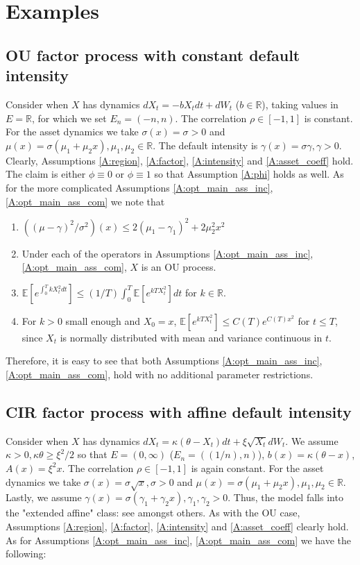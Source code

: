 \documentclass[11pt, letterpaper]{amsart}
\theoremstyle{definition}
\theoremstyle{remark}
\numberwithin{equation}{section}
\newcommand{\reals}{\mathbb R}
\newcommand{\esp}{\mathbb{E}}
\newcommand{\bra}[1]{\left[#1\right]}
\begin{document}
\section{Examples}\label{S:examples}

\subsection{OU factor process with constant default intensity}\label{SS:OU}  Consider when $X$ has dynamics $dX_t = -bX_t dt + dW_t$ ($b\in\reals$), taking values in $E = \reals$,  for which we set $E_n = (-n,n)$. The correlation $\rho \in [-1,1]$ is constant.  For the asset dynamics we take $\sigma(x) = \sigma > 0$ and  $\mu(x) = \sigma\left(\mu_1 + \mu_2x\right), \mu_1,\mu_2\in\reals$. The default intensity is $\gamma(x) = \sigma\gamma, \gamma > 0$. Clearly, Assumptions \ref{A:region}, \ref{A:factor}, \ref{A:intensity} and \ref{A:asset_coeff} hold.  The claim is either $\phi\equiv 0$ or $\phi\equiv 1$ so that Assumption \ref{A:phi} holds as well.  As for the more complicated Assumptions \ref{A:opt_main_ass_inc}, \ref{A:opt_main_ass_com} we note that
\begin{enumerate}[(1)]
\item $((\mu-\gamma)^2/\sigma^2)(x) \leq 2(\mu_1-\gamma_1)^2 + 2\mu_2^2 x^2$
\item Under each of the operators in Assumptions \ref{A:opt_main_ass_inc}, \ref{A:opt_main_ass_com}, $X$ is an OU process.
\item $\esp\bra{e^{\int_0^T kX_t^2dt}} \leq (1/T)\int_0^T \esp\bra{e^{kT X_t^2}}dt$ for $k\in\reals$.
\item For $k>0$ small enough and $X_0=x$, $\esp\bra{e^{kT X_t^2}} \leq C(T)e^{C(T)x^2}$ for $t\leq T$, since $X_t$ is normally distributed with mean and variance continuous in $t$.
\end{enumerate}
Therefore, it is easy to see that both Assumptions \ref{A:opt_main_ass_inc}, \ref{A:opt_main_ass_com}, hold with no additional parameter restrictions.

\subsection{CIR factor process with affine default intensity}\label{SS:CIR} Consider when $X$ has dynamics $dX_t = \kappa(\theta - X_t)dt + \xi\sqrt{X_t}dW_t$.  We assume $\kappa > 0, \kappa\theta \geq \xi^2/2$ so that $E=(0,\infty)$ ($E_n =((1/n),n)$), $b(x) = \kappa(\theta-x)$, $A(x) = \xi^2 x$.  The correlation $\rho\in [-1,1]$ is again constant. For the asset dynamics we take $\sigma(x) = \sigma\sqrt{x}, \sigma > 0$ and $\mu(x) = \sigma(\mu_1 + \mu_2 x), \mu_1,\mu_2\in\reals$.  Lastly, we assume $\gamma(x) = \sigma(\gamma_1 + \gamma_2 x), \gamma_1,\gamma_2 > 0$. Thus, the model falls into the "extended affine" class: see \cite{dai2000saa,MR1994043,filipovic2001general} amongst others.  As with the OU case, Assumptions \ref{A:region}, \ref{A:factor}, \ref{A:intensity} and \ref{A:asset_coeff} clearly hold.  As for Assumptions \ref{A:opt_main_ass_inc}, \ref{A:opt_main_ass_com} we have the following:
\end{document}
